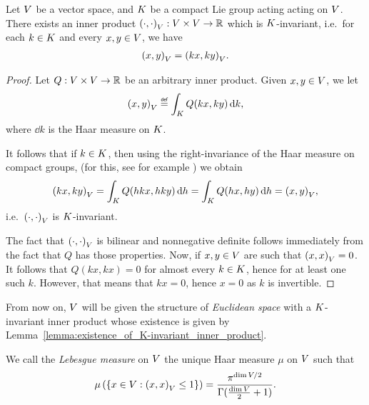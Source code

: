 \begin{lemma}
\label{lemma:existence_of_K-invariant_inner_product}
    Let $V$ be a vector space,
    and $K$ be a compact Lie group acting acting on $V$.
    There exists an inner product ${\left(\cdot, \cdot\right)_{V}} : V \times V \to \mathbb{R}$ which is $K$-invariant,
    i.e.\ for each $k \in K$ and every $x, y \in V$, we have
    \begin{align*}
        {\left(x, y\right)_{V}} = {\left(k x, k y\right)_{V}}.
    \end{align*}
\end{lemma}
\begin{proof}
    Let $Q : V \times V \to \mathbb{R}$ be an arbitrary inner product.
    Given $x, y \in V$, we let
    \begin{align*}
        \ip{x}{y} \defeq \int_\CompactGroup Q(k x, k y) \dd k,
    \end{align*}
    where $\dd k$ is the Haar measure on $K$.

    It follows that if $k \in K$,
    then using the right-invariance of the Haar measure on compact groups,
    (for this, see for example \cite[Theorem 7.4.21]{RuzhanskyTurunen10})
    we obtain
    \begin{align*}
        {\left(k x, k y\right)_{V}}
        = \int_K Q(h k x, h k y) \,\mathrm{d} h
        = \int_K Q(h x, h y) \,\mathrm{d} h
        = {\left(x, y\right)_{V}},
    \end{align*}
    i.e.\ ${\left(\cdot, \cdot\right)_{V}}$ is $K$-invariant.

    The fact that ${\left(\cdot, \cdot\right)_{V}}$ is bilinear and nonnegative definite follows immediately from the fact that $Q$ has those properties.
    Now, if $x, y \in V$ are such that ${\left(x, x\right)_{V}} = 0$.
    It follows that $Q(k x, k x) = 0$ for almost every $k \in K$, hence for at least one such $k$.
    However, that means that $k x = 0$, hence $x = 0$ as $k$ is invertible.
\end{proof}

From now on, $V$ will be given the structure of \emph{Euclidean space} with a $K$-invariant inner product
whose existence is given by Lemma~\ref{lemma:existence_of_K-invariant_inner_product}.

\begin{definition}
    We call the \emph{Lebesgue measure} on $V$
    the unique Haar measure $\mu$ on $V$ such that
    \begin{align*}
        \mu\left(\{x \in V : {\left(x, x\right)_{V}} \leq 1\}\right) = \frac{\pi^{\dim V/2}}{\Gamma(\frac{\dim V}{2} + 1)}.
    \end{align*}
\end{definition}

